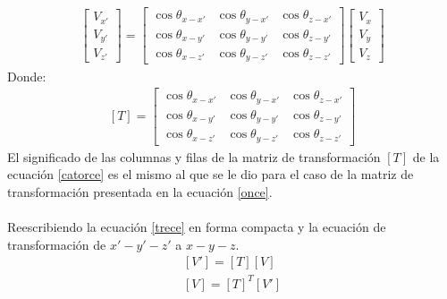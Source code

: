 \documentclass[12pt,letterpaper]{article}
\begin{document}
\begin{eqnarray}
		\left[ \begin{array}{c} V_{x'} \\
		V_{y'} \\ V_{z'} \end{array} \right] = 
		\left[ \begin{array}{ccc}
		\cos \theta_{x-x'} & \cos \theta_{y-x'} & \cos \theta_{z-x'} \\  
		\cos \theta_{x-y'} & \cos \theta_{y-y'} & \cos \theta_{z-y'} \\
		\cos \theta_{x-z'} & \cos \theta_{y-z'} & \cos \theta_{z-z'}
		\end{array}  \right] 
		\left[ \begin{array}{c} V_{x} \\
		V_{y} \\ V_{z} \end{array} \right]
		\label{trece}
\end{eqnarray}
%
Donde:
%
\begin{align}
	\left[ T \right] = \left[ \begin{array}{ccc}
		\cos \theta_{x-x'} & \cos \theta_{y-x'} & \cos \theta_{z-x'} \\  
		\cos \theta_{x-y'} & \cos \theta_{y-y'} & \cos \theta_{z-y'} \\
		\cos \theta_{x-z'} & \cos \theta_{y-z'} & \cos \theta_{z-z'}
		\end{array}  \right] \label{catorce}
\end{align}
%
El significado de las columnas y filas de la matriz de transformación $\left[ T \right]$ de la ecuación \ref{catorce} es el mismo al que se le dio para el caso de la matriz de transformación presentada en la ecuación \ref{once}.\\\\
%
Reescribiendo la ecuación \ref{trece} en forma compacta y la ecuación de transformación de $x'-y'-z'$ a $x-y-z$.
%
\begin{align*}
	\left[ V' \right] = \left[ T \right] \left[ V \right] \\
	\left[ V \right] = \left[ T \right]^T \left[ V' \right]
\end{align*}
%
%
\end{document}
